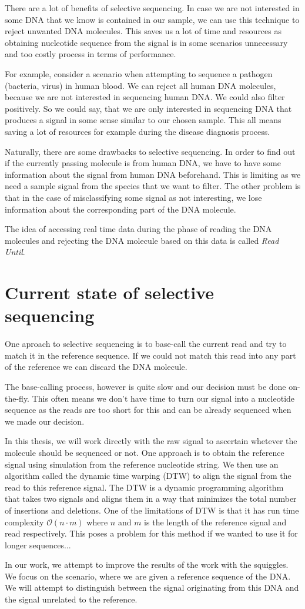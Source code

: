 There are a lot of benefits of selective sequencing. In case we are not interested
in some DNA that we know is contained in our sample, we can use this technique to
reject unwanted DNA molecules. This saves us a lot of time and resources as obtaining
nucleotide sequence from the signal is in some scenarios unnecessary and too
costly process in terms of performance.

For example, consider a scenario when attempting to sequence a pathogen (bacteria, virus) in human blood. We can
reject all human DNA molecules, because we are not interested in sequencing human
DNA. We could also filter positively. So we could say, that we are only
interested in sequencing DNA that produces a signal in some sense similar to our
chosen sample. This all means saving a lot of resources for example during the disease diagnosis process.

Naturally, there are some drawbacks to selective sequencing. In order to find out
if the currently passing molecule is from human DNA, we have to have some information
about the signal from human DNA beforehand. This is limiting as we need a sample signal from
the species that we want to filter. The other problem is that in the case of misclassifying
some signal as not interesting, we lose information about the corresponding
part of the DNA molecule.

The idea of accessing real time data during the phase of reading the DNA molecules
and rejecting the DNA molecule based on this data is called \textit{Read Until}. 

\section{Current state of selective sequencing}


One aproach to selective sequencing is to base-call the current read
and try to match it in the reference sequence. If we could not match this read
into any part of the reference we can discard the DNA molecule.

The base-calling process, however is quite slow and our decision must be done on-the-fly.
This often means we don't have time to turn our signal into a nucleotide sequence
as the reads are too short for this and can be already sequenced when we made our decision.

In this thesis, we will work directly with the raw signal to ascertain whetever the molecule
should be sequenced or not. One approach\cite{loose2016real} is to obtain the reference signal using
simulation from the reference nucleotide string. We then use an algorithm called
the dynamic time warping (DTW) to align the signal from the read to this reference signal.
The DTW is a dynamic programming algorithm that takes two signals and aligns them in a
way that minimizes the total number of insertions and deletions. One of the limitations
of DTW is that it has run time complexity $\mathcal{O}(n\cdot m)$ where $n$ and $m$
is the length of the reference signal and read respectively. This poses a problem
for this method if we wanted to use it for longer sequences...

In our work, we attempt to improve the results of the work with the squiggles.
We focus on the scenario, where we are given a reference sequence of the DNA. We
will attempt to distinguish between the signal originating from this DNA and the
signal unrelated to the reference.
